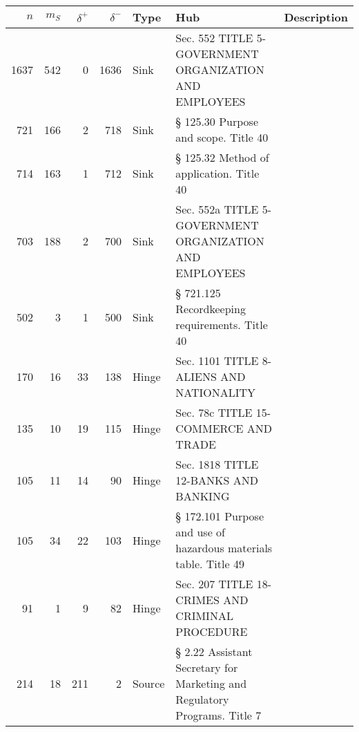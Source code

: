 \begin{tabular}{rrrrlp{}p{}}
\hline
   $n$ &   $m_S$ &   $\delta^+$ &   $\delta^-$ & \textbf{Type}   & \textbf{Hub}                                                               & \textbf{Description}   \\
\hline
  1637 &     542 &            0 &         1636 & Sink            & Sec. 552 TITLE 5-GOVERNMENT ORGANIZATION AND EMPLOYEES                     &                        \\
   721 &     166 &            2 &          718 & Sink            & § 125.30 Purpose and scope. Title 40                                       &                        \\
   714 &     163 &            1 &          712 & Sink            & § 125.32 Method of application. Title 40                                   &                        \\
   703 &     188 &            2 &          700 & Sink            & Sec. 552a TITLE 5-GOVERNMENT ORGANIZATION AND EMPLOYEES                    &                        \\
   502 &       3 &            1 &          500 & Sink            & § 721.125 Recordkeeping requirements. Title 40                             &                        \\
   170 &      16 &           33 &          138 & Hinge           & Sec. 1101 TITLE 8-ALIENS AND NATIONALITY                                   &                        \\
   135 &      10 &           19 &          115 & Hinge           & Sec. 78c TITLE 15-COMMERCE AND TRADE                                       &                        \\
   105 &      11 &           14 &           90 & Hinge           & Sec. 1818 TITLE 12-BANKS AND BANKING                                       &                        \\
   105 &      34 &           22 &          103 & Hinge           & § 172.101 Purpose and use of hazardous materials table. Title 49           &                        \\
    91 &       1 &            9 &           82 & Hinge           & Sec. 207 TITLE 18-CRIMES AND CRIMINAL PROCEDURE                            &                        \\
   214 &      18 &          211 &            2 & Source          & § 2.22 Assistant Secretary for Marketing and Regulatory Programs. Title 7  &                        \\

\end{tabular}
